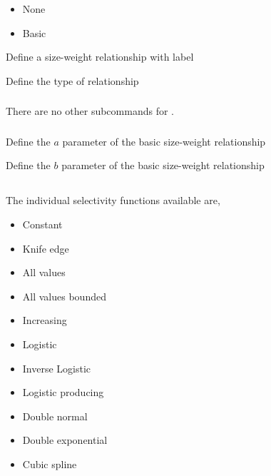 \begin{itemize}
	\item None
	\item Basic
\end{itemize}

 {Define a size-weight relationship with label}

 {Define the type of relationship}

\subsubsection[None]{}

There are no other subcommands for .

\subsubsection[Basic]{}

 {Define the $a$ parameter of the basic size-weight relationship}

 {Define the $b$ parameter of the basic size-weight relationship}

\subsection{}

The individual selectivity functions available are,

\begin{itemize}
	\item Constant
	\item Knife edge
	\item All values
	\item All values bounded
	\item Increasing
	\item Logistic
	\item Inverse Logistic
	\item Logistic producing
	\item Double normal
	\item Double exponential
	\item Cubic spline
\end{itemize}

